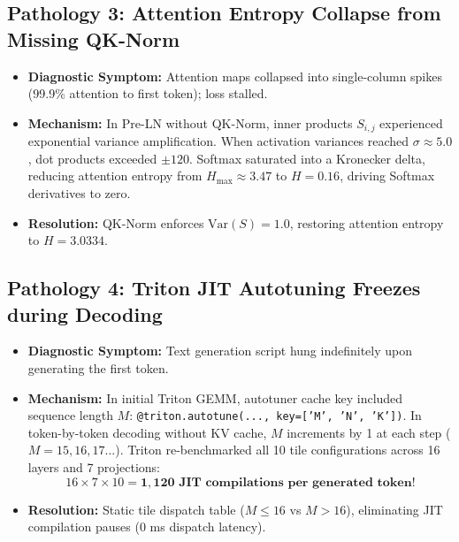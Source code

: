 \documentclass[11pt,a4paper]{article}
\begin{document}
\subsection{Pathology 3: Attention Entropy Collapse from Missing QK-Norm}
\begin{itemize}
    \item \textbf{Diagnostic Symptom:} Attention maps collapsed into single-column spikes (99.9\% attention to first token); loss stalled.
    \item \textbf{Mechanism:} In Pre-LN without QK-Norm, inner products $S_{i, j}$ experienced exponential variance amplification. When activation variances reached $\sigma \approx 5.0$, dot products exceeded $\pm 120$. Softmax saturated into a Kronecker delta, reducing attention entropy from $H_{\max} \approx 3.47$ to $H = 0.16$, driving Softmax derivatives to zero.
    \item \textbf{Resolution:} QK-Norm enforces $\text{Var}(S) = 1.0$, restoring attention entropy to $H = \mathbf{3.0334}$.
\end{itemize}

\subsection{Pathology 4: Triton JIT Autotuning Freezes during Decoding}
\begin{itemize}
    \item \textbf{Diagnostic Symptom:} Text generation script hung indefinitely upon generating the first token.
    \item \textbf{Mechanism:} In initial Triton GEMM, autotuner cache key included sequence length $M$: \texttt{@triton.autotune(..., key=['M', 'N', 'K'])}. In token-by-token decoding without KV cache, $M$ increments by 1 at each step ($M = 15, 16, 17\dots$). Triton re-benchmarked all 10 tile configurations across 16 layers and 7 projections:
    \begin{equation}
    16 \times 7 \times 10 = \mathbf{1,120 \text{ JIT compilations per generated token!}}
    \end{equation}
    \item \textbf{Resolution:} Static tile dispatch table ($M \le 16$ vs $M > 16$), eliminating JIT compilation pauses ($0$ ms dispatch latency).
\end{itemize}
\end{document}
